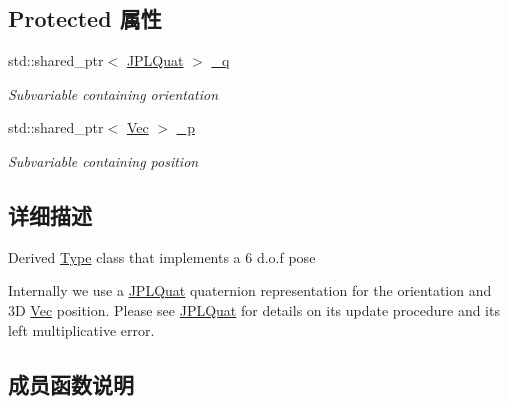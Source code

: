 \subsection*{Protected 属性}
\begin{DoxyCompactItemize}
\item 
\mbox{\label{classov__type_1_1PoseJPL_a945324efa203146186f18faa7fb83bdb}} 
std\+::shared\+\_\+ptr$<$ \hyperlink{classov__type_1_1JPLQuat}{J\+P\+L\+Quat} $>$ \hyperlink{classov__type_1_1PoseJPL_a945324efa203146186f18faa7fb83bdb}{\+\_\+q}
\begin{DoxyCompactList}\small\item\em Subvariable containing orientation \end{DoxyCompactList}\item 
\mbox{\label{classov__type_1_1PoseJPL_aa5054d412515696961240ca29586ce16}} 
std\+::shared\+\_\+ptr$<$ \hyperlink{classov__type_1_1Vec}{Vec} $>$ \hyperlink{classov__type_1_1PoseJPL_aa5054d412515696961240ca29586ce16}{\+\_\+p}
\begin{DoxyCompactList}\small\item\em Subvariable containing position \end{DoxyCompactList}\end{DoxyCompactItemize}


\subsection{详细描述}
Derived \hyperlink{classov__type_1_1Type}{Type} class that implements a 6 d.\+o.\+f pose 

Internally we use a \hyperlink{classov__type_1_1JPLQuat}{J\+P\+L\+Quat} quaternion representation for the orientation and 3D \hyperlink{classov__type_1_1Vec}{Vec} position. Please see \hyperlink{classov__type_1_1JPLQuat}{J\+P\+L\+Quat} for details on its update procedure and its left multiplicative error. 

\subsection{成员函数说明}
\mbox{\label{classov__type_1_1PoseJPL_aa2138dce0eef761ebbeacc0136da34cc}} 
